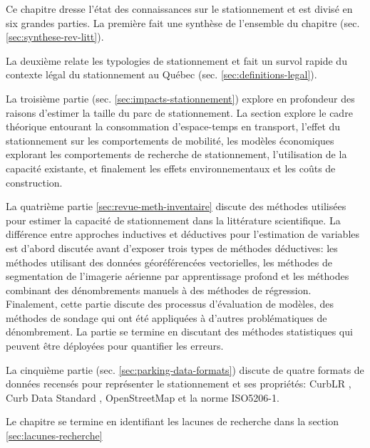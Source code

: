 \label{sec:RevLitt}
Ce chapitre dresse l'état des connaissances sur le stationnement et est divisé en six grandes parties. La première fait une synthèse de l'ensemble du chapitre (sec. \ref{sec:synthese-rev-litt}). \par
La deuxième relate les typologies de stationnement et fait un survol rapide du contexte légal du stationnement au Québec (sec. \ref{sec:definitions-legal}).

La troisième partie (sec. \ref{sec:impacts-stationnement}) explore en profondeur des raisons d'estimer la taille du parc de stationnement. La section explore le cadre théorique entourant la consommation d'espace-temps en transport, l'effet du stationnement sur les comportements de mobilité, les modèles économiques explorant les comportements de recherche de stationnement, l'utilisation de la capacité existante, et finalement les effets environnementaux et les coûts de construction. \par

La quatrième partie \ref{sec:revue-meth-inventaire} discute des méthodes utilisées pour estimer la capacité de stationnement dans la littérature scientifique. La différence entre approches inductives et déductives pour l'estimation de variables est d'abord discutée avant d'exposer trois types de méthodes déductives: les méthodes utilisant des données géoréférencées vectorielles, les méthodes de segmentation de l'imagerie aérienne par apprentissage profond et les méthodes combinant des dénombrements manuels à des méthodes de régression. Finalement, cette partie discute des processus d'évaluation de modèles, des méthodes de sondage qui ont été appliquées à d'autres problématiques de dénombrement. La partie se termine en discutant des méthodes statistiques qui peuvent être déployées pour quantifier les erreurs. \par

La cinquième partie (sec. \ref{sec:parking-data-formats}) discute de quatre formats de données recensés pour représenter le stationnement et ses propriétés: CurbLR , Curb Data Standard , OpenStreetMap et la norme ISO5206-1.\par

Le chapitre se termine en identifiant les lacunes de recherche dans la section \ref{sec:lacunes-recherche}
